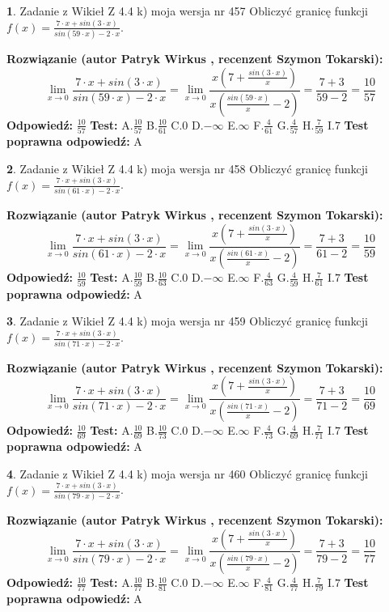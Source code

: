 \documentclass[12pt, a4paper]{article}
\theoremstyle{definition} %
\newtheorem{zad}{}
\newcommand{\zadStart}[1]{\begin{zad}#1\newline}
\newcommand{\zadStop}{\end{zad}}
\newcommand{\rozwStart}[2]{\noindent \textbf{Rozwiązanie (autor #1 , recenzent #2): }\newline}
\newcommand{\rozwStop}{\newline}
\newcommand{\odpStart}{\noindent \textbf{Odpowiedź:}\newline}
\newcommand{\odpStop}{\newline}
\newcommand{\testStart}{\noindent \textbf{Test:}\newline}
\newcommand{\testStop}{\newline}
\newcommand{\kluczStart}{\noindent \textbf{Test poprawna odpowiedź:}\newline}
\newcommand{\kluczStop}{\newline}
\begin{document}
\zadStart{Zadanie z Wikieł Z 4.4 k) moja wersja nr 457}
Obliczyć granicę funkcji $f(x)=\frac{7\cdot x +sin(3\cdot x)}{sin(59\cdot x) -2\cdot x}$.
\zadStop
\rozwStart{Patryk Wirkus}{Szymon Tokarski}
$$\lim\limits_{x\to 0}\frac{7\cdot x +sin(3\cdot x)}{sin(59\cdot x) -2\cdot x}
=\lim\limits_{x\to 0}\frac{x(7+\frac{sin(3\cdot x)}{x})}{x(\frac{sin(59\cdot x)}{x}-2)}
=\frac{7+3}{59-2} = \frac{10}{57}$$
\rozwStop
\odpStart
$\frac{10}{57}$
\odpStop
\testStart
A.$\frac{10}{57}$
B.$\frac{10}{61}$
C.$0$
D.$-\infty$
E.$\infty$
F.$\frac{4}{61}$
G.$\frac{4}{57}$
H.$\frac{7}{59}$
I.$7$
\testStop
\kluczStart
A
\kluczStop



\zadStart{Zadanie z Wikieł Z 4.4 k) moja wersja nr 458}
Obliczyć granicę funkcji $f(x)=\frac{7\cdot x +sin(3\cdot x)}{sin(61\cdot x) -2\cdot x}$.
\zadStop
\rozwStart{Patryk Wirkus}{Szymon Tokarski}
$$\lim\limits_{x\to 0}\frac{7\cdot x +sin(3\cdot x)}{sin(61\cdot x) -2\cdot x}
=\lim\limits_{x\to 0}\frac{x(7+\frac{sin(3\cdot x)}{x})}{x(\frac{sin(61\cdot x)}{x}-2)}
=\frac{7+3}{61-2} = \frac{10}{59}$$
\rozwStop
\odpStart
$\frac{10}{59}$
\odpStop
\testStart
A.$\frac{10}{59}$
B.$\frac{10}{63}$
C.$0$
D.$-\infty$
E.$\infty$
F.$\frac{4}{63}$
G.$\frac{4}{59}$
H.$\frac{7}{61}$
I.$7$
\testStop
\kluczStart
A
\kluczStop



\zadStart{Zadanie z Wikieł Z 4.4 k) moja wersja nr 459}
Obliczyć granicę funkcji $f(x)=\frac{7\cdot x +sin(3\cdot x)}{sin(71\cdot x) -2\cdot x}$.
\zadStop
\rozwStart{Patryk Wirkus}{Szymon Tokarski}
$$\lim\limits_{x\to 0}\frac{7\cdot x +sin(3\cdot x)}{sin(71\cdot x) -2\cdot x}
=\lim\limits_{x\to 0}\frac{x(7+\frac{sin(3\cdot x)}{x})}{x(\frac{sin(71\cdot x)}{x}-2)}
=\frac{7+3}{71-2} = \frac{10}{69}$$
\rozwStop
\odpStart
$\frac{10}{69}$
\odpStop
\testStart
A.$\frac{10}{69}$
B.$\frac{10}{73}$
C.$0$
D.$-\infty$
E.$\infty$
F.$\frac{4}{73}$
G.$\frac{4}{69}$
H.$\frac{7}{71}$
I.$7$
\testStop
\kluczStart
A
\kluczStop



\zadStart{Zadanie z Wikieł Z 4.4 k) moja wersja nr 460}
Obliczyć granicę funkcji $f(x)=\frac{7\cdot x +sin(3\cdot x)}{sin(79\cdot x) -2\cdot x}$.
\zadStop
\rozwStart{Patryk Wirkus}{Szymon Tokarski}
$$\lim\limits_{x\to 0}\frac{7\cdot x +sin(3\cdot x)}{sin(79\cdot x) -2\cdot x}
=\lim\limits_{x\to 0}\frac{x(7+\frac{sin(3\cdot x)}{x})}{x(\frac{sin(79\cdot x)}{x}-2)}
=\frac{7+3}{79-2} = \frac{10}{77}$$
\rozwStop
\odpStart
$\frac{10}{77}$
\odpStop
\testStart
A.$\frac{10}{77}$
B.$\frac{10}{81}$
C.$0$
D.$-\infty$
E.$\infty$
F.$\frac{4}{81}$
G.$\frac{4}{77}$
H.$\frac{7}{79}$
I.$7$
\testStop
\kluczStart
A
\kluczStop
\end{document}

